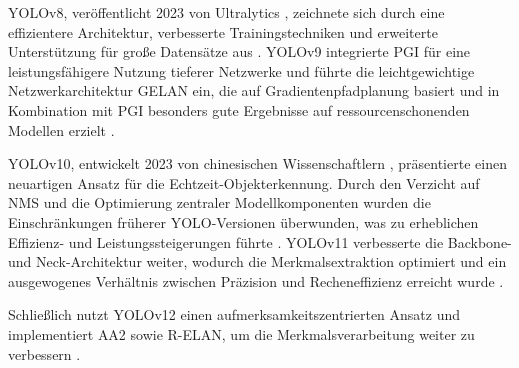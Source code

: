 YOLOv8, veröffentlicht 2023 von Ultralytics \cite{ultralyics_2023}, zeichnete sich durch eine effizientere Architektur, verbesserte Trainingstechniken und erweiterte Unterstützung für große Datensätze aus \cite{Sapkota2025,ultralyics_2023}. YOLOv9 \cite{wang2024_sapkota} integrierte \acrfull{PGI} für eine leistungsfähigere Nutzung tieferer Netzwerke und führte die leichtgewichtige Netzwerkarchitektur \acrfull{GELAN} ein, die auf Gradientenpfadplanung basiert und in Kombination mit \acrshort{PGI} besonders gute Ergebnisse auf ressourcenschonenden Modellen erzielt \cite{Sapkota2025,wang2024_sapkota}.

YOLOv10, entwickelt 2023 von chinesischen Wissenschaftlern \cite{wang2024}, präsentierte einen neuartigen Ansatz für die Echtzeit-Objekterkennung. Durch den Verzicht auf \acrfull{NMS} und die Optimierung zentraler Modellkomponenten wurden die Einschränkungen früherer YOLO-Versionen überwunden, was zu erheblichen Effizienz- und Leistungssteigerungen führte \cite{wang2024}. YOLOv11 verbesserte die Backbone- und Neck-Architektur weiter, wodurch die Merkmalsextraktion optimiert und ein ausgewogenes Verhältnis zwischen Präzision und Recheneffizienz erreicht wurde \cite{Sapkota2025,ultralyics_yolov11}.

Schließlich nutzt YOLOv12 einen aufmerksamkeitszentrierten Ansatz und implementiert \acrfull{AA2} sowie \acrfull{R-ELAN}, um die Merkmalsverarbeitung weiter zu verbessern \cite{tian2025,Sapkota2025}.

